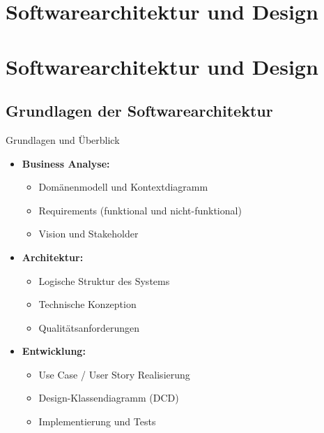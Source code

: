 \section{Softwarearchitektur und Design}

\section{Softwarearchitektur und Design}

\subsection{Grundlagen der Softwarearchitektur}

\begin{concept}{Grundlagen und Überblick}
\begin{itemize}
    \item \textbf{Business Analyse:}
    \begin{itemize}
        \item Domänenmodell und Kontextdiagramm
        \item Requirements (funktional und nicht-funktional)
        \item Vision und Stakeholder
    \end{itemize}
    
    \item \textbf{Architektur:}
    \begin{itemize}
        \item Logische Struktur des Systems
        \item Technische Konzeption
        \item Qualitätsanforderungen
    \end{itemize}
    
    \item \textbf{Entwicklung:}
    \begin{itemize}
        \item Use Case / User Story Realisierung
        \item Design-Klassendiagramm (DCD)
        \item Implementierung und Tests
    \end{itemize}
\end{itemize}


\end{concept}
